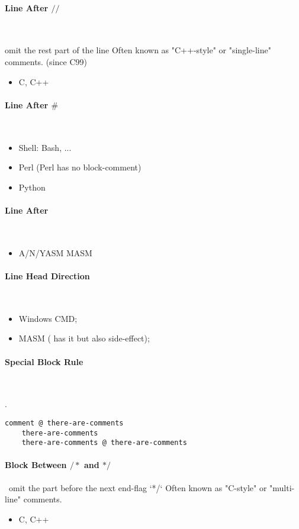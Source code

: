 
\paragraph{Line After $//$} \

omit the rest part of the line
Often known as "C++-style" or "single-line" comments.
(since C99)
\begin{itemize}
	\item {C, C++}
\end{itemize}

\paragraph{Line After $\#$} \
\begin{itemize}
	\item Shell: Bash, ...
	\item Perl (Perl has no block-comment)
	\item Python
\end{itemize}

\paragraph{Line After $\;$} \
\begin{itemize}
	\item A/N/YASM MASM
\end{itemize}

\paragraph{Line Head Direction} \
\begin{itemize}
	\item {} Windows CMD;
	\item \B{TITLE} MASM (\B{END} has it but also side-effect);
\end{itemize}

\paragraph{Special Block Rule} \ \\

.
\begin{lstlisting}[language={[x86masm]Assembler}]
	comment @ there-are-comments
	there-are-comments
	there-are-comments @ there-are-comments
\end{lstlisting}


\paragraph{Block Between $/*$ and $*/$} \
omit the part before the next end-flag `*/`
Often known as "C-style" or "multi-line" comments.
\begin{itemize}
	\item {C, C++}
\end{itemize}


